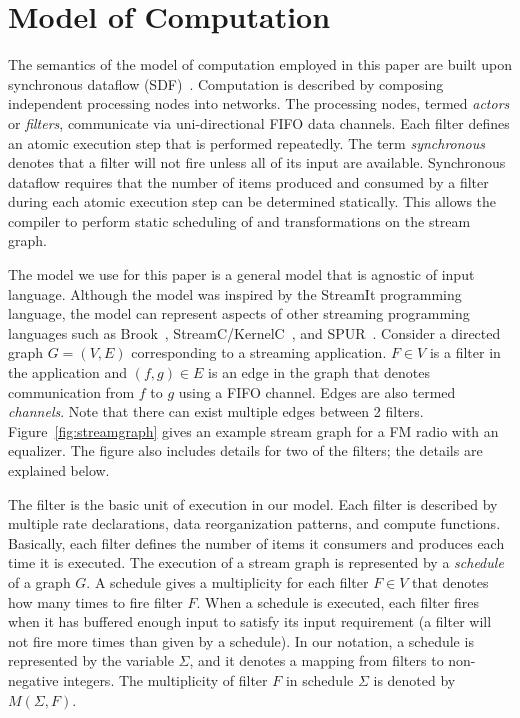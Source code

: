\section{Model of Computation}

The semantics of the model of computation employed in this
paper are built upon synchronous dataflow (SDF)~\cite{leeSDF}.
Computation is described by composing independent processing nodes
into networks.  The processing nodes, termed {\it actors} or {\it
  filters}, communicate via uni-directional FIFO data channels.  Each
filter defines an atomic execution step that is performed repeatedly.
The term {\it synchronous} denotes that a filter will not fire unless
all of its input are available.  Synchronous dataflow requires that
the number of items produced and consumed by a filter during each
atomic execution step can be determined statically.  This allows the
compiler to perform static scheduling of and transformations on the
stream graph.

The model we use for this paper is a general model that is agnostic
of input language.  Although the model was inspired by the StreamIt
programming language, the model can represent aspects of other
streaming programming languages such as Brook~\cite{brook04},
StreamC/KernelC~\cite{imagine03ieee}, and SPUR~\cite{spur05samos}.
Consider a directed graph $G = (V, E)$ corresponding to a streaming
application. $F \in V$ is a filter in the application and $(f, g) \in
E$ is an edge in the graph that denotes communication from $f$ to $g$
using a FIFO channel.  Edges are also termed {\it channels}. Note that
there can exist multiple edges between 2
filters. Figure~\ref{fig:streamgraph} gives an example stream graph
for a FM radio with an equalizer.  The figure also includes details
for two of the filters; the details are explained below.

The filter is the basic unit of execution in our model.  Each filter
is described by multiple rate declarations, data reorganization
patterns, and compute functions.  Basically, each filter defines the
number of items it consumers and produces each time it is executed.
The execution of a stream graph is represented by a {\it schedule} of
a graph $G$.  A schedule gives a multiplicity for each filter $F \in
V$ that denotes how many times to fire filter $F$.  When a schedule is
executed, each filter fires when it has buffered enough input to
satisfy its input requirement (a filter will not fire more times than
given by a schedule).  In our notation, a schedule is represented by
the variable $\Sigma$, and it denotes a mapping from filters to
non-negative integers. The multiplicity of filter $F$ in schedule
$\Sigma$ is denoted by $M(\Sigma, F)$.

